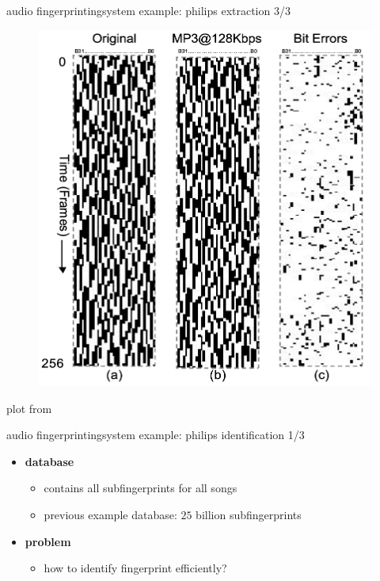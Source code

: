         \begin{frame}{audio fingerprinting}{system example: philips extraction 3/3}
            \begin{figure}
                \centering
                \includegraphics[scale=.25]{graph/fingerprint_example}
            \end{figure}
            plot from 
        \end{frame}
        
        \begin{frame}{audio fingerprinting}{system example: philips identification 1/3}
            \begin{itemize}
                \item	\textbf{database}
                    \begin{itemize}
                        \item	contains all subfingerprints for all songs
                        \item<2->	previous example database: $25$ billion subfingerprints
                        \bigskip
                    \end{itemize}
                \item<3->	\textbf{problem}
                    \begin{itemize}
                        \item how to identify fingerprint efficiently?
                    \end{itemize}
            \end{itemize}
        \end{frame}
        
